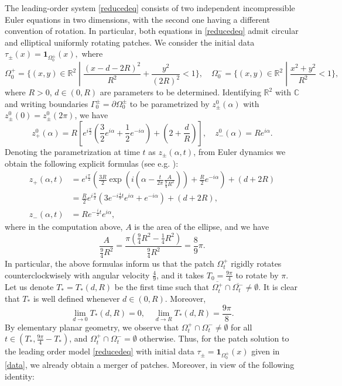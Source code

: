 \documentclass[11pt,reqno]{amsproc}
\newcommand{\pa}{\partial}
\newcommand{\R}{\mathbb{R}}
\begin{document}
The leading-order system \eqref{reducedeq} consists of two independent incompressible Euler equations in two dimensions, with the second one having a different convention of rotation. In particular, both equations in \eqref{reducedeq} admit circular and elliptical uniformly rotating patches. We consider the initial data
$
\tau_\pm(x) = \mathbf 1_{\Omega_0^\pm }(x),
$
where 
\begin{equation}\label{data}
\Omega_0^+ = \{(x,y) \in \R^2\; |\; \frac{(x-d-2R)^2}{R^2} + \frac{y^2}{(2R)^2} < 1\},\quad \Omega_0^- = \{(x,y) \in \R^2\;|\; \frac{x^2 + y^2}{R^2} < 1\},
\end{equation}
where $R > 0$, $d \in (0,R)$ are parameters to be determined. Identifying $\R^2$ with $\mathbb{C}$ and writing boundaries $\Gamma_0^\pm = \pa \Omega_0^\pm$ to be parametrized by $z_\pm^0(\alpha)$ with $z_\pm^0(0) = z_\pm^0 (2\pi)$, we have
$$
z_+^0(\alpha) = R\left[e^{i\frac\pi2}\left(\frac{3}{2}e^{i\alpha} + \frac{1}{2}e^{-i\alpha}\right) + \left(2+\frac{d}{R}\right)\right],\quad z_-^0(\alpha) = Re^{i\alpha}.
$$
Denoting the parametrization at time $t$ as $z_\pm(\alpha,t)$, from Euler dynamics we obtain the following explicit formulas (see e.g. \cite{farfield}):
\begin{equation}\label{background}
\begin{aligned}
z_+(\alpha,t) &= e^{i\frac\pi2}\left(\frac{3R}{2}\exp\left({i(\alpha-\frac{t}{2\pi}\frac{A}{\frac94 R^2})}\right) + \frac{R}{2}e^{-i\alpha}\right) + (d+2R)\\
&= \frac{R}{2}e^{i\frac{\pi}{2}}\left(3e^{-i\frac49 t}e^{i\alpha} + e^{-i\alpha}\right)+ (d+2R),\\
z_-(\alpha,t) &= Re^{-\frac{i}{2}t}e^{i\alpha},
\end{aligned}
\end{equation}
where in the computation above, $A$ is the area of the ellipse, and we have
$$
\frac{A}{\frac94 R^2} = \frac{\pi\left(\frac94 R^2 - \frac14 R^2\right)}{\frac94 R^2} = \frac89 \pi.
$$
In particular, the above formulas inform us that the patch $\Omega_t^+$ rigidly rotates counterclockwisely with angular velocity $\frac49$, and it takes $T_0 = \frac{9\pi}{4}$ to rotate by $\pi$. Let us denote $T_* = T_*(d,R)$ be the first time such that $\overline{\Omega_t^+} \cap\overline{\Omega_t^-} \neq \emptyset$. It is clear that $T_*$ is well defined whenever $d \in (0,R)$. Moreover,
$$
\lim_{d \to 0} T_*(d,R) = 0,\quad \lim_{d \to R} T_*(d,R) = \frac{9\pi}{8}.
$$
By elementary planar geometry, we observe that ${\Omega_t^+} \cap {\Omega_t^-} \neq \emptyset$ for all $t \in (T_*, \frac{9\pi}{4} - T_*)$, and ${\Omega_t^+} \cap {\Omega_t^-} = \emptyset$ otherwise. Thus, for the patch solution to the leading order model \eqref{reducedeq} with initial data $\tau_\pm = \mathbf 1_{\Omega_0^\pm }(x)$ given in \eqref{data}, we already obtain a merger of patches. Moreover, in view of the following identity:
\end{document}
